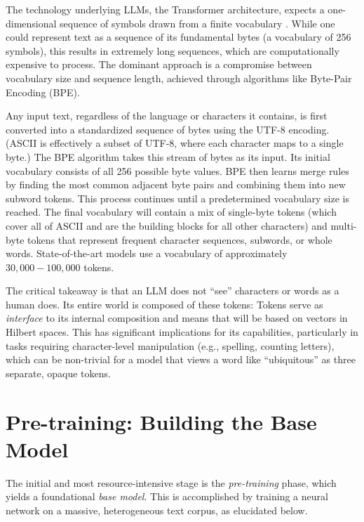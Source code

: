 \documentclass[%
  reprint,
  superscriptaddress,
  showpacs,
  showkeys,
  amsmath,amssymb,
  pra,
  longbibliography,
  floatfix,
  x11names
]{revtex4-2}
\begin{document}
The technology underlying LLMs, the Transformer architecture, expects a one-dimensional sequence of symbols drawn from a finite vocabulary \cite{Vaswani-2017-Attention}. While one could represent text as a sequence of its fundamental bytes (a vocabulary of 256 symbols), this results in extremely long sequences, which are computationally expensive to process. The dominant approach is a compromise between vocabulary size and sequence length, achieved through algorithms like Byte-Pair Encoding (BPE).

Any input text, regardless of the language or characters it contains,
is first converted into a standardized sequence of bytes using the UTF-8 encoding.
(ASCII is effectively a subset of UTF-8, where each character maps to a single byte.)
The BPE algorithm takes this stream of bytes as its input.
Its initial vocabulary consists of all 256 possible byte values.
BPE then learns merge rules by finding the most common adjacent byte pairs
and combining them into new subword tokens.
This process continues until a predetermined vocabulary size is reached.
The final vocabulary will contain a mix of single-byte tokens
(which cover all of ASCII and are the building blocks for all other characters)
and multi-byte tokens that represent frequent character sequences, subwords, or whole words.
State-of-the-art models use a vocabulary of approximately $30,000-100,000$ tokens.

The critical takeaway is that an LLM does not ``see'' characters or words as a human does.
Its entire world is composed of these tokens:
Tokens serve as \textit{interface}
to its internal composition and means that will be based on vectors in Hilbert spaces.
This has significant implications for its capabilities,
particularly in tasks requiring character-level manipulation (e.g., spelling, counting letters),
which can be non-trivial for a model that views a word like ``ubiquitous'' as three separate, opaque tokens.

\section{Pre-training: Building the Base Model}


The initial and most resource-intensive stage is the \textit{pre-training} phase,
 which yields a foundational \textit{base model}.
This is accomplished by training a neural network on a massive, heterogeneous text corpus, as elucidated below.
\end{document}
